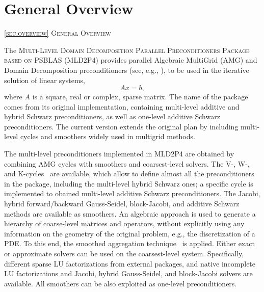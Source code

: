 \section{General Overview\label{sec:overview}}
         {\textsc{\ref{sec:overview} General Overview}}
            
The \textsc{Multi-Level Domain Decomposition Parallel Preconditioners Package based on
PSBLAS (MLD2P4}) provides parallel Algebraic MultiGrid (AMG) and Domain 
Decomposition preconditioners (see, e.g., \cite{Briggs2000,Stuben_01,dd2_96}),
to be used in the iterative solution of  linear systems,
\begin{equation} 
Ax=b, 
\label{system1}
\end{equation} 
where $A$ is a square, real or complex, sparse matrix. 
%
%
The name of the package comes from its original implementation, containing
multi-level additive and hybrid Schwarz preconditioners, as well as one-level additive
Schwarz preconditioners. The current version extends the original plan by including
multi-level cycles and smoothers widely used in multigrid methods.

The multi-level preconditioners implemented in MLD2P4 are obtained by combining
AMG cycles with smoothers and coarsest-level solvers. The V-, W-, and
K-cycles~\cite{Briggs2000,Notay2008} are available, which allow to define
almost all the preconditioners in the package, including the multi-level hybrid
Schwarz ones; a specific cycle is implemented to obained multi-level additive
Schwarz preconditioners. The Jacobi, hybrid
forward/backward Gauss-Seidel, block-Jacobi, and additive Schwarz methods
are available as smoothers. An algebraic approach is used to generate a hierarchy of
coarse-level matrices and operators, without explicitly using any information on the
geometry of the original problem, e.g., the discretization of a PDE. To this end,
the smoothed aggregation technique~\cite{BREZINA_VANEK,VANEK_MANDEL_BREZINA}
is applied. Either exact or approximate solvers can be used on the coarsest-level
system. Specifically, different sparse LU factorizations from external
packages, and native incomplete LU factorizations and Jacobi, hybrid Gauss-Seidel,
and block-Jacobi solvers are available. All smoothers can be also exploited as one-level 
preconditioners.

